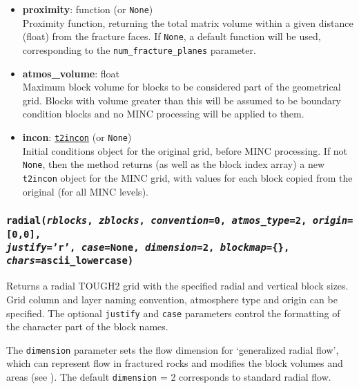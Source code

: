 \begin{itemize}
\item \textbf{proximity}: function (or \texttt{None})\\
  Proximity function, returning the total matrix volume within a given distance (float) from the fracture faces. If \texttt{None}, a default function will be used, corresponding to the \texttt{num\_fracture\_planes} parameter.
\item \textbf{atmos\_volume}: float\\
  Maximum block volume for blocks to be considered part of the geometrical grid. Blocks with volume greater than this will be assumed to be boundary condition blocks and no MINC processing will be applied to them.
\item \textbf{incon}: \hyperref[incons]{\texttt{t2incon}} (or \texttt{None})\\
  Initial conditions object for the original grid, before MINC processing. If not \texttt{None}, then the method returns (as well as the block index array) a new \texttt{t2incon} object for the MINC grid, with values for each block copied from the original (for all MINC levels).
\end{itemize}


\begin{snugshade}
\subsubsection{\texttt{radial(\emph{rblocks}, \emph{zblocks}, \emph{convention}=0, \emph{atmos\_type}=2, \emph{origin}=[0,0],\\
    \emph{justify}='r', \emph{case}=None, \emph{dimension}=2, \emph{blockmap}=\{\}, \emph{chars}=ascii\_lowercase)}}
\end{snugshade}
\label{sec:t2grid:radial}

Returns a radial TOUGH2 grid with the specified radial and vertical block sizes.  Grid column and layer naming convention, atmosphere type and origin can be specified.  The optional \texttt{justify} and \texttt{case} parameters control the formatting of the character part of the block names.

The \texttt{dimension} parameter sets the flow dimension for `generalized radial flow', which can represent flow in fractured rocks and modifies the block volumes and areas (see \cite{barker_1988}).  The default \texttt{dimension} = 2 corresponds to standard radial flow.

